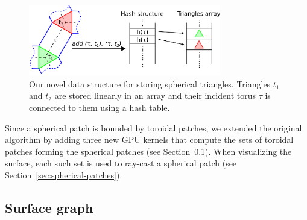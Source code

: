 \begin{figure}[htb]
  \centering
  \includegraphics[width=3.3in]{image/hashing.png}
  \caption{Our novel data structure for storing spherical triangles. Triangles $t_1$ and $t_2$ are stored linearly in an array and their incident torus $\tau$ is connected to them using a hash table.}
	\label{fig:hashing}
\end{figure}

Since a spherical patch is bounded by toroidal patches, we extended the original algorithm by adding three new GPU kernels that compute the sets of toroidal patches forming the spherical patches (see Section~\ref{sec:graph}).
When visualizing the surface, each such set is used to ray-cast a spherical patch (see Section~\ref{sec:spherical-patches}).


\subsection{Surface graph}
\label{sec:graph}
   
